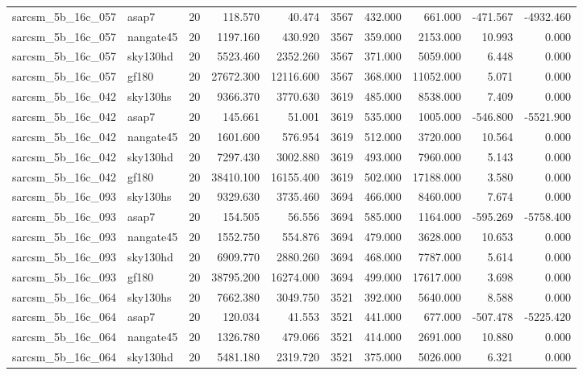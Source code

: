 \begin{tabular}{llrrrrrrrr}
sarcsm\_5b\_16c\_057 & asap7 & 20 & 118.570 & 40.474 & 3567 & 432.000 & 661.000 & -471.567 & -4932.460 \\
sarcsm\_5b\_16c\_057 & nangate45 & 20 & 1197.160 & 430.920 & 3567 & 359.000 & 2153.000 & 10.993 & 0.000 \\
sarcsm\_5b\_16c\_057 & sky130hd & 20 & 5523.460 & 2352.260 & 3567 & 371.000 & 5059.000 & 6.448 & 0.000 \\
sarcsm\_5b\_16c\_057 & gf180 & 20 & 27672.300 & 12116.600 & 3567 & 368.000 & 11052.000 & 5.071 & 0.000 \\
sarcsm\_5b\_16c\_042 & sky130hs & 20 & 9366.370 & 3770.630 & 3619 & 485.000 & 8538.000 & 7.409 & 0.000 \\
sarcsm\_5b\_16c\_042 & asap7 & 20 & 145.661 & 51.001 & 3619 & 535.000 & 1005.000 & -546.800 & -5521.900 \\
sarcsm\_5b\_16c\_042 & nangate45 & 20 & 1601.600 & 576.954 & 3619 & 512.000 & 3720.000 & 10.564 & 0.000 \\
sarcsm\_5b\_16c\_042 & sky130hd & 20 & 7297.430 & 3002.880 & 3619 & 493.000 & 7960.000 & 5.143 & 0.000 \\
sarcsm\_5b\_16c\_042 & gf180 & 20 & 38410.100 & 16155.400 & 3619 & 502.000 & 17188.000 & 3.580 & 0.000 \\
sarcsm\_5b\_16c\_093 & sky130hs & 20 & 9329.630 & 3735.460 & 3694 & 466.000 & 8460.000 & 7.674 & 0.000 \\
sarcsm\_5b\_16c\_093 & asap7 & 20 & 154.505 & 56.556 & 3694 & 585.000 & 1164.000 & -595.269 & -5758.400 \\
sarcsm\_5b\_16c\_093 & nangate45 & 20 & 1552.750 & 554.876 & 3694 & 479.000 & 3628.000 & 10.653 & 0.000 \\
sarcsm\_5b\_16c\_093 & sky130hd & 20 & 6909.770 & 2880.260 & 3694 & 468.000 & 7787.000 & 5.614 & 0.000 \\
sarcsm\_5b\_16c\_093 & gf180 & 20 & 38795.200 & 16274.000 & 3694 & 499.000 & 17617.000 & 3.698 & 0.000 \\
sarcsm\_5b\_16c\_064 & sky130hs & 20 & 7662.380 & 3049.750 & 3521 & 392.000 & 5640.000 & 8.588 & 0.000 \\
sarcsm\_5b\_16c\_064 & asap7 & 20 & 120.034 & 41.553 & 3521 & 441.000 & 677.000 & -507.478 & -5225.420 \\
sarcsm\_5b\_16c\_064 & nangate45 & 20 & 1326.780 & 479.066 & 3521 & 414.000 & 2691.000 & 10.880 & 0.000 \\
sarcsm\_5b\_16c\_064 & sky130hd & 20 & 5481.180 & 2319.720 & 3521 & 375.000 & 5026.000 & 6.321 & 0.000 \\

\end{tabular}
